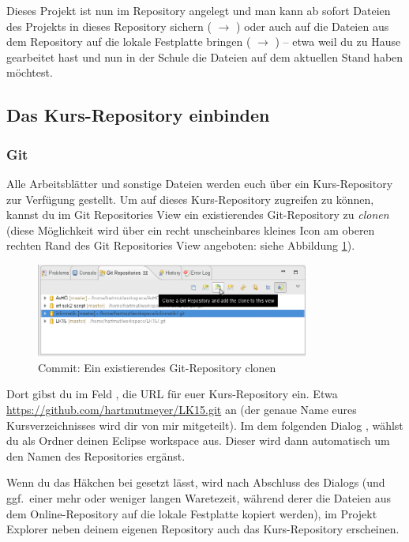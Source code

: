 Dieses Projekt ist nun im Repository angelegt und man kann ab sofort Dateien des
Projekts in dieses Repository sichern ( $\rightarrow$
) oder auch auf die Dateien aus dem Repository auf die
lokale Festplatte bringen ( $\rightarrow$ )
-- etwa weil du zu Hause gearbeitet hast und nun in der Schule die Dateien auf
dem aktuellen Stand haben möchtest.

\subsection{Das Kurs-Repository einbinden}

\subsubsection{Git}

Alle Arbeitsblätter und sonstige Dateien werden euch über ein Kurs-Repository
zur Verfügung gestellt. Um auf dieses Kurs-Repository zugreifen zu können,
kannst du im Git Repositories View ein existierendes Git-Repository zu
\emph{clonen} (diese Möglichkeit wird über ein recht unscheinbares kleines Icon
am oberen rechten Rand des Git Repositories View angeboten: siehe Abbildung
\ref{fig:git-clone}).

\begin{figure}[h]
  \centering
   \includegraphics[width=0.8\textwidth]{./inf/SEKII/01_Vorbereitung/Cloning_a_Git_Repository.png}
   \caption{Commit: Ein existierendes Git-Repository clonen}
   \label{fig:git-clone}
\end{figure}

Dort gibst du im Feld , die URL für euer Kurs-Repository ein. Etwa
\url{https://github.com/hartmutmeyer/LK15.git} an (der genaue Name eures
Kursverzeichnisses wird dir von mir mitgeteilt). Im dem folgenden Dialog
, wählst du als Ordner deinen
Eclipse workspace aus. Dieser wird dann automatisch um den Namen des
Repositories ergänst.

Wenn du das Häkchen bei  gesetzt lässt, wird nach Abschluss des Dialogs (und ggf.\ einer mehr
oder weniger langen Waretezeit, während derer die Dateien aus dem
Online-Repository auf die lokale Festplatte kopiert werden), im Projekt Explorer
neben deinem eigenen Repository auch das Kurs-Repository erscheinen.

